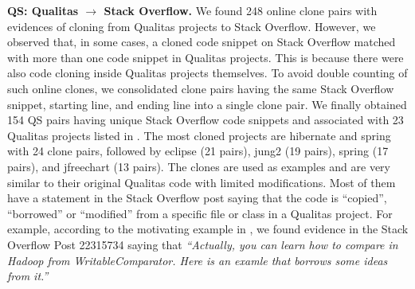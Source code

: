 \documentclass[10pt,journal,compsoc]{IEEEtran}
\begin{document}
\textbf{QS: Qualitas $\rightarrow$ Stack Overflow.} We found 248 online clone
pairs with evidences of cloning from Qualitas projects to Stack Overflow.
However, we observed that, in some cases, a cloned code snippet on Stack
Overflow matched with more than one code snippet in Qualitas projects. This is
because there were also code cloning inside Qualitas projects themselves. To
avoid double counting of such online clones, we consolidated clone pairs having
the same Stack Overflow snippet, starting line, and ending line into a single
clone pair. We finally obtained 154 QS pairs having unique Stack Overflow code
snippets and associated with 23 Qualitas projects listed in
. The most cloned projects are \textsf{hibernate}
and \textsf{spring} with 24 clone pairs, followed by \textsf{eclipse} (21
pairs), \textsf{jung2} (19 pairs), \textsf{spring} (17 pairs), and
\textsf{jfreechart} (13 pairs). The clones are used as examples and are very
similar to their original Qualitas code with limited modifications. Most of them
have a statement in the Stack Overflow post saying that the code is ``copied'',
``borrowed'' or ``modified'' from a specific file or class in a Qualitas
project. For example, according to the motivating example in
, we found evidence in the Stack Overflow Post 22315734
saying that \textit{``Actually, you can learn how to compare in Hadoop from
	WritableComparator. Here is an examle that borrows some ideas from it.''}
\end{document}
